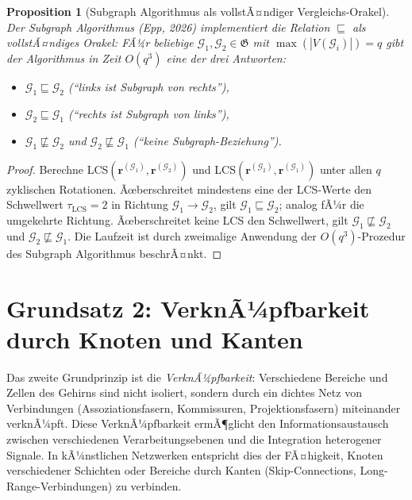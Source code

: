 ﻿\documentclass[12pt, a4paper, openany]{report}
\newtheorem{proposition}[theorem]{Proposition}
\newcommand{\calG}{\mathcal{G}}
\begin{document}
\begin{proposition}[Subgraph Algorithmus als vollstÃ¤ndiger Vergleichs-Orakel]
\label{prop:subgraph_oracle}
Der Subgraph Algorithmus (Epp, 2026) implementiert die Relation
$\sqsubseteq$ als vollstÃ¤ndiges Orakel: FÃ¼r beliebige
$\calG_1, \calG_2 \in \mathfrak{G}$ mit $\max(|V(\calG_i)|) = q$ gibt der
Algorithmus in Zeit $O(q^3)$ eine der drei Antworten:
\begin{itemize}
  \item $\calG_1 \sqsubseteq \calG_2$ (``links ist Subgraph von rechts''),
  \item $\calG_2 \sqsubseteq \calG_1$ (``rechts ist Subgraph von links''),
  \item $\calG_1 \not\sqsubseteq \calG_2$ und $\calG_2 \not\sqsubseteq \calG_1$ (``keine Subgraph-Beziehung'').
\end{itemize}
\end{proposition}

\begin{proof}
Berechne LCS$(\bm{r}^{(\calG_1)}, \bm{r}^{(\calG_2)})$ und
LCS$(\bm{r}^{(\calG_2)}, \bm{r}^{(\calG_1)})$ unter allen $q$ zyklischen
Rotationen.  Ãœberschreitet mindestens eine der LCS-Werte den Schwellwert
$\tau_{\mathrm{LCS}} = 2$ in Richtung $\calG_1 \to \calG_2$, gilt
$\calG_1 \sqsubseteq \calG_2$; analog fÃ¼r die umgekehrte Richtung.
Ãœberschreitet keine LCS den Schwellwert, gilt
$\calG_1 \not\sqsubseteq \calG_2$ und $\calG_2 \not\sqsubseteq \calG_1$.  Die Laufzeit ist durch zweimalige
Anwendung der $O(q^3)$-Prozedur des Subgraph Algorithmus beschrÃ¤nkt.
\end{proof}

\section{Grundsatz 2: VerknÃ¼pfbarkeit durch Knoten und Kanten}
\label{sec:bio_linkability}

Das zweite Grundprinzip ist die \emph{VerknÃ¼pfbarkeit}: Verschiedene
Bereiche und Zellen des Gehirns sind nicht isoliert, sondern durch
ein dichtes Netz von Verbindungen (Assoziationsfasern, Kommissuren,
Projektionsfasern) miteinander verknÃ¼pft.  Diese VerknÃ¼pfbarkeit ermÃ¶glicht
den Informationsaustausch zwischen verschiedenen Verarbeitungsebenen und
die Integration heterogener Signale.  In kÃ¼nstlichen Netzwerken entspricht
dies der FÃ¤higkeit, Knoten verschiedener Schichten oder Bereiche durch
Kanten (Skip-Connections, Long-Range-Verbindungen) zu verbinden.
\end{document}
